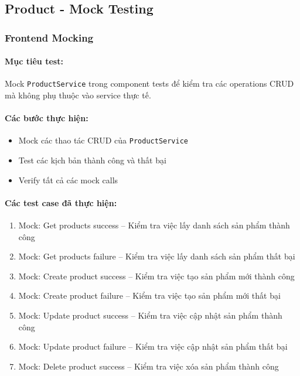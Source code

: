 \documentclass[a4paper,12pt]{article}
\begin{document}
\subsection{Product - Mock Testing}
\subsubsection{Frontend Mocking}
\paragraph{Mục tiêu test:}
Mock \texttt{ProductService} trong component tests để kiểm tra các operations CRUD mà không phụ thuộc vào service thực tế.

\paragraph{Các bước thực hiện:}
\begin{itemize}
  \item Mock các thao tác CRUD của \texttt{ProductService}
  \item Test các kịch bản thành công và thất bại
  \item Verify tất cả các mock calls
\end{itemize}

\paragraph{Các test case đã thực hiện:}
\begin{enumerate}
  \item Mock: Get products success – Kiểm tra việc lấy danh sách sản phẩm thành công
  \item Mock: Get products failure – Kiểm tra việc lấy danh sách sản phẩm thất bại
  \item Mock: Create product success – Kiểm tra việc tạo sản phẩm mới thành công
  \item Mock: Create product failure – Kiểm tra việc tạo sản phẩm mới thất bại
  \item Mock: Update product success – Kiểm tra việc cập nhật sản phẩm thành công
  \item Mock: Update product failure – Kiểm tra việc cập nhật sản phẩm thất bại
  \item Mock: Delete product success – Kiểm tra việc xóa sản phẩm thành công
\end{enumerate}
\end{document}
